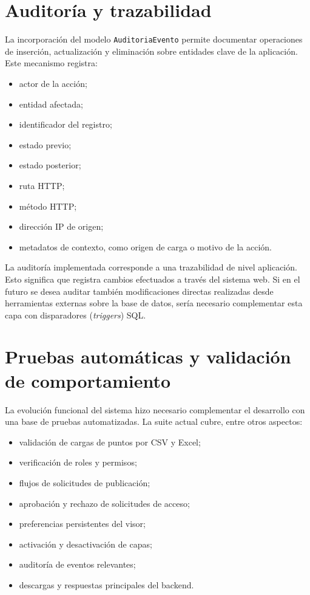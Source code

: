 \documentclass[12pt,a4paper]{report}
\begin{document}
\section{Auditor\'ia y trazabilidad}

La incorporaci\'on del modelo \texttt{AuditoriaEvento} permite documentar operaciones de inserci\'on, actualizaci\'on y eliminaci\'on sobre entidades clave de la aplicaci\'on. Este mecanismo registra:

\begin{itemize}
    \item actor de la acci\'on;
    \item entidad afectada;
    \item identificador del registro;
    \item estado previo;
    \item estado posterior;
    \item ruta HTTP;
    \item m\'etodo HTTP;
    \item direcci\'on IP de origen;
    \item metadatos de contexto, como origen de carga o motivo de la acci\'on.
\end{itemize}

La auditor\'ia implementada corresponde a una trazabilidad de nivel aplicaci\'on. Esto significa que registra cambios efectuados a trav\'es del sistema web. Si en el futuro se desea auditar tambi\'en modificaciones directas realizadas desde herramientas externas sobre la base de datos, ser\'ia necesario complementar esta capa con disparadores (\emph{triggers}) SQL.

\section{Pruebas autom\'aticas y validaci\'on de comportamiento}

La evoluci\'on funcional del sistema hizo necesario complementar el desarrollo con una base de pruebas automatizadas. La suite actual cubre, entre otros aspectos:

\begin{itemize}
    \item validaci\'on de cargas de puntos por CSV y Excel;
    \item verificaci\'on de roles y permisos;
    \item flujos de solicitudes de publicaci\'on;
    \item aprobaci\'on y rechazo de solicitudes de acceso;
    \item preferencias persistentes del visor;
    \item activaci\'on y desactivaci\'on de capas;
    \item auditor\'ia de eventos relevantes;
    \item descargas y respuestas principales del backend.
\end{itemize}
\end{document}
